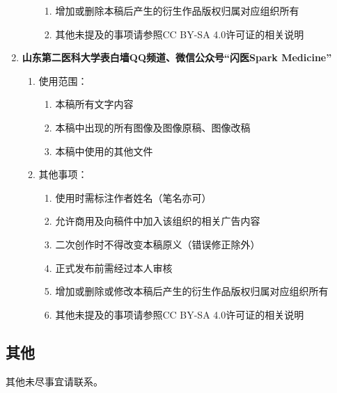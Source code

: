 \begin{enumerate}
\begin{enumerate}
\begin{enumerate}
                        \item 增加或删除本稿后产生的衍生作品版权归属对应组织所有
                        \item 其他未提及的事项请参照CC BY-SA 4.0许可证的相关说明
                    \end{enumerate}
          \end{enumerate}
    \item \textbf{山东第二医科大学表白墙QQ频道、微信公众号“闪医Spark Medicine”}
          \begin{enumerate}
              \item 使用范围：
                    \begin{enumerate}
                        \item 本稿所有文字内容
                        \item 本稿中出现的所有图像及图像原稿、图像改稿
                        \item 本稿中使用的其他文件
                    \end{enumerate}
              \item 其他事项：
                    \begin{enumerate}
                        \item 使用时需标注作者姓名（笔名亦可）
                        \item 允许商用及向稿件中加入该组织的相关广告内容
                        \item 二次创作时不得改变本稿原义（错误修正除外）
                        \item 正式发布前需经过本人审核
                        \item 增加或删除或修改本稿后产生的衍生作品版权归属对应组织所有
                        \item 其他未提及的事项请参照CC BY-SA 4.0许可证的相关说明
                    \end{enumerate}
          \end{enumerate}
\end{enumerate}

\subsection[其他]{其他}
其他未尽事宜请联系。
